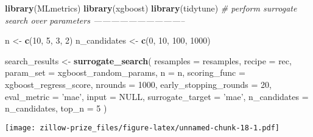 \documentclass[]{book}
\newenvironment{Shaded}{\begin{snugshade}}{\end{snugshade}}
\newcommand{\KeywordTok}[1]{\textcolor[rgb]{0.13,0.29,0.53}{\textbf{#1}}}
\newcommand{\DataTypeTok}[1]{\textcolor[rgb]{0.13,0.29,0.53}{#1}}
\newcommand{\DecValTok}[1]{\textcolor[rgb]{0.00,0.00,0.81}{#1}}
\newcommand{\StringTok}[1]{\textcolor[rgb]{0.31,0.60,0.02}{#1}}
\newcommand{\CommentTok}[1]{\textcolor[rgb]{0.56,0.35,0.01}{\textit{#1}}}
\newcommand{\OtherTok}[1]{\textcolor[rgb]{0.56,0.35,0.01}{#1}}
\newcommand{\OperatorTok}[1]{\textcolor[rgb]{0.81,0.36,0.00}{\textbf{#1}}}
\newcommand{\NormalTok}[1]{#1}
\theoremstyle{definition}
\theoremstyle{definition}
\theoremstyle{definition}
\theoremstyle{remark}
\begin{document}
\begin{Shaded}
\begin{Highlighting}[]
\KeywordTok{library}\NormalTok{(MLmetrics)}
\KeywordTok{library}\NormalTok{(xgboost)}
\KeywordTok{library}\NormalTok{(tidytune)}
\CommentTok{# perform surrogate search over parameters --------------------------------}

\NormalTok{n <-}\StringTok{ }\KeywordTok{c}\NormalTok{(}\DecValTok{10}\NormalTok{, }\DecValTok{5}\NormalTok{, }\DecValTok{3}\NormalTok{, }\DecValTok{2}\NormalTok{)}
\NormalTok{n_candidates <-}\StringTok{ }\KeywordTok{c}\NormalTok{(}\DecValTok{0}\NormalTok{, }\DecValTok{10}\NormalTok{, }\DecValTok{100}\NormalTok{, }\DecValTok{1000}\NormalTok{)}

\NormalTok{search_results <-}\StringTok{ }
\StringTok{  }\KeywordTok{surrogate_search}\NormalTok{(}
    \DataTypeTok{resamples =}\NormalTok{ resamples,}
    \DataTypeTok{recipe =}\NormalTok{ rec,}
    \DataTypeTok{param_set =}\NormalTok{ xgboost_random_params,}
    \DataTypeTok{n =}\NormalTok{ n,}
    \DataTypeTok{scoring_func =}\NormalTok{ xgboost_regress_score,}
    \DataTypeTok{nrounds =} \DecValTok{1000}\NormalTok{,}
    \DataTypeTok{early_stopping_rounds =} \DecValTok{20}\NormalTok{,}
    \DataTypeTok{eval_metric =} \StringTok{'mae'}\NormalTok{,}
    \DataTypeTok{input =} \OtherTok{NULL}\NormalTok{,}
    \DataTypeTok{surrogate_target =} \StringTok{'mae'}\NormalTok{,}
    \DataTypeTok{n_candidates =}\NormalTok{ n_candidates,}
    \DataTypeTok{top_n =} \DecValTok{5}
\NormalTok{  )}
\end{Highlighting}
\end{Shaded}

\begin{Shaded}
\end{Shaded}

\texttt{[image: zillow-prize\_files/figure-latex/unnamed-chunk-18-1.pdf]}
\end{document}
